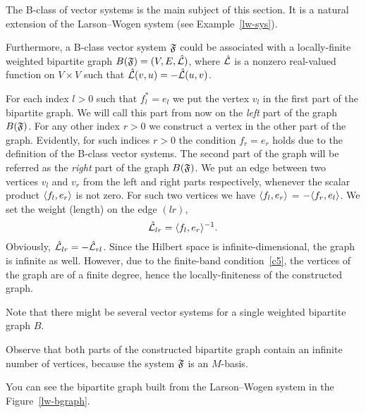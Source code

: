 \documentclass[12pt,oneside,a4paper]{amsart}
\begin{document}
    The B-class of vector systems is the main subject of this section.
    It is a natural extension of the Larson--Wogen system (see Example~\ref{lw-sys}).

    Furthermore, a B-class vector system $\mathfrak{F}$ could be associated with a
      locally-finite weighted bipartite graph $B(\mathfrak{F}) = (V, E, \hat{\mathcal{L}})$, where $\hat{\mathcal{L}}$ is a
      nonzero real-valued function on $V\times V$ such that $\hat{\mathcal{L}}(v, u) = -\hat{\mathcal{L}}(u, v)$.

    For each index $l > 0$ such that $f^*_l = e_l$ we put the vertex $v_l$ in the first part of the bipartite graph.
    We will call this part from now on the \emph{left} part of the graph $B(\mathfrak{F})$.
    For any other index $r > 0$ we construct a vertex in the other part of the graph.
    Evidently, for such indices $r > 0$ the condition $f_r = e_r$ holds due to the definition of the B-class vector systems.
    The second part of the graph will be referred as the \emph{right} part of the graph $B(\mathfrak{F})$.
    We put an edge between two vertices $v_l$ and $v_r$ from the left and right parts respectively,
      whenever the scalar product $\langle f_l, e_r \rangle$ is not zero.
    For such two vertices we have $\langle f_l, e_r \rangle$ = $-\langle f_r, e_l \rangle$.
    We set the weight (length) on the edge $(lr)$,
    \[
      \hat{\mathcal{L}}_{lr} = \langle f_l, e_r \rangle^{-1}.
    \]
    Obviously, $\hat{\mathcal{L}}_{lr} = -\hat{\mathcal{L}}_{rl}$.
    Since the Hilbert space is infinite-dimensional, the graph is infinite as well.
    However, due to the finite-band condition~\ref{c5}, the vertices of the graph are of a finite degree, hence the locally-finiteness of
      the constructed graph.
    \begin{remark}
      Note that there might be several vector systems for a single weighted bipartite graph $B$.
    \end{remark}
    \begin{remark}
      Observe that both parts of the constructed bipartite graph contain an infinite number of vertices, because
        the system $\mathfrak{F}$ is an $M$-basis.
    \end{remark}
    You can see the bipartite graph built from the Larson--Wogen system in the Figure~\ref{lw-bgraph}.
\end{document}
